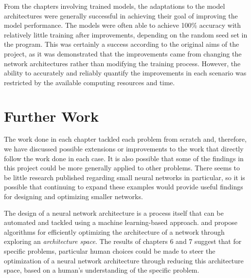 \documentclass{somasmsc}
\begin{document}
From the chapters involving trained models, the adaptations to the model architectures were generally successful in achieving their goal of improving the model performance. The models were often able to achieve 100\% accuracy with relatively little training after improvements, depending on the random seed set in the program. This was certainly a success according to the original aims of the project, as it was demonstrated that the improvements came from changing the network architectures rather than modifying the training process. However, the ability to accurately and reliably quantify the improvements in each scenario was restricted by the available computing resources and time.

\section{Further Work}

The work done in each chapter tackled each problem from scratch and, therefore, we have discussed possible extensions or improvements to the work that directly follow the work done in each case. It is also possible that some of the findings in this project could be more generally applied to other problems. There seems to be little research published regarding small neural networks in particular, so it is possible that continuing to expand these examples would provide useful findings for designing and optimizing smaller networks.

The design of a neural network architecture is a process itself that can be automated and tackled using a machine learning-based approach. \citet{luo2018neural} and \citet{pham2018efficient} propose algorithms for efficiently optimizing the architecture of a network through exploring an \textit{architecture space}. The results of chapters 6 and 7 suggest that for specific problems, particular human choices could be made to steer the optimization of a neural network architecture through reducing this architecture space, based on a human's understanding of the specific problem.






\backmatter
\renewcommand{\bibname}{References}



\end{document}

